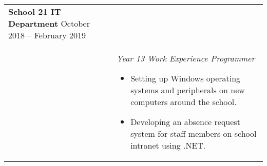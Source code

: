 \documentclass[11pt]{article}
\begin{document}
\begin{minipage}[t][0pt]{\linewidth}
\begin{tabular}[t]{p{2cm} p{14cm}}
    	\textbf{School 21 IT Department}  \hfill October 2018 – February 2019 \\ &
		\textit{Year 13 Work Experience Programmer}
		\begin{itemize}
			\renewcommand{\labelitemi}{$\diamond$}
			\item Setting up Windows operating systems and peripherals on new computers around the school.
			\item Developing an absence request system for staff members on school intranet using .NET.
		\end{itemize} \\

\end{tabular}
\end{minipage}

\pagebreak
\end{document}
